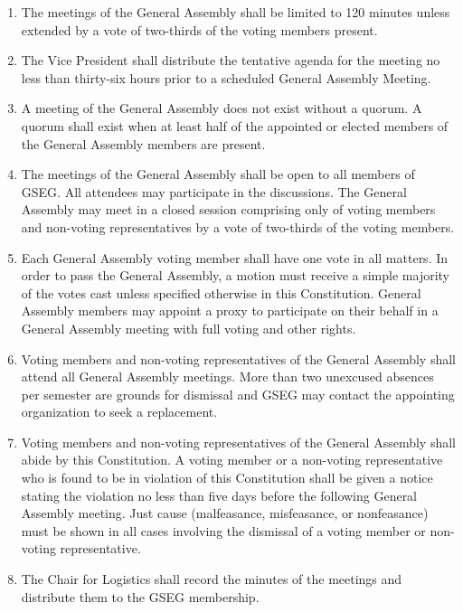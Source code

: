 \begin{enumerate}[label=\Alph*.]
	\item The meetings of the General Assembly shall be limited to 120 minutes unless extended
	by a vote of two-thirds of the voting members present.

	\item The Vice President shall distribute the tentative agenda for the meeting no less than
	thirty-six hours prior to a scheduled General Assembly Meeting.

	\item A meeting of the General Assembly does not exist without a quorum. A quorum shall exist
	when at least half of the appointed or elected members of the General Assembly members are
	present.

	\item The meetings of the General Assembly shall be open to all members of GSEG. All attendees
	may participate in the discussions. The General Assembly may meet in a closed session
	comprising only of voting members and non-voting representatives by a vote of two-thirds of the
	voting members.

	\item Each General Assembly voting member shall have one vote in all matters. In order to pass
	the General Assembly, a motion must receive a simple majority of the votes cast unless
	specified otherwise in this Constitution. General Assembly members may appoint a proxy to participate on their behalf in a General Assembly meeting with full voting and other rights.

	\item Voting members and non-voting representatives of the General Assembly shall attend all
	General Assembly meetings. More than two unexcused absences per semester are grounds for
	dismissal and GSEG may contact the appointing organization to seek a replacement.

	\item Voting members and non-voting representatives of the General Assembly shall abide by
	this Constitution. A voting member or a non-voting representative who is found to be in
	violation of this Constitution shall be given a notice stating the violation no less
	than five days before the following General Assembly meeting. Just cause (malfeasance,
	misfeasance, or nonfeasance) must be shown in all cases involving the dismissal of a voting
	member or non-voting representative.

	\item The Chair for Logistics shall record the minutes of the meetings and distribute them to
	the GSEG membership.

\end{enumerate}

